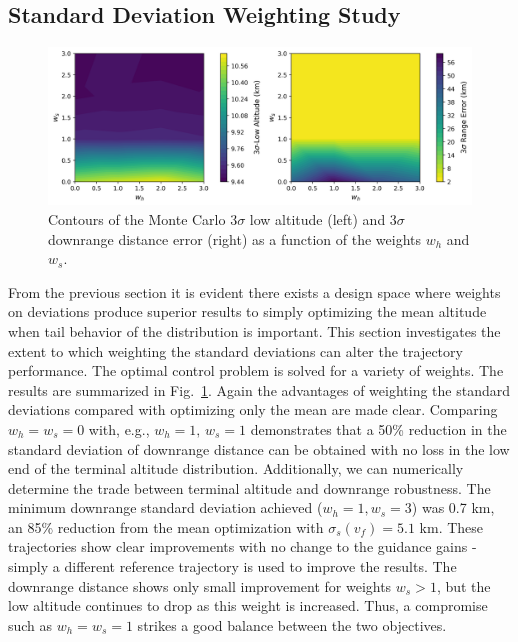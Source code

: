 \documentclass[journal ]{new-aiaa}
\begin{document}
\subsection*{Standard Deviation Weighting Study}
\begin{figure}[h!]
	\centering
	\includegraphics[width=1\textwidth]{ddp/python/WeightSweepMC}
	\caption{Contours of the Monte Carlo 3$\sigma$ low altitude (left) and 3$\sigma$ downrange distance error (right) as a function of the weights $w_h$ and $w_s$.}
	\label{fig_weight_sweep}
\end{figure}
From the previous section it is evident there exists a design space where weights on deviations produce superior results to simply optimizing the mean altitude when tail behavior of the distribution is important. This section investigates the extent to which weighting the standard deviations can alter the trajectory performance. The optimal control problem is solved for a variety of weights. The results are summarized in Fig.~\ref{fig_weight_sweep}. Again the advantages of weighting the standard deviations compared with optimizing only the mean are made clear. Comparing $w_h=w_s=0$ with, e.g., $w_h=1,\,w_s = 1$ demonstrates that a 50\% reduction in the standard deviation of downrange distance can be obtained with no loss in the low end of the terminal altitude distribution. Additionally, we can numerically determine the trade between terminal altitude and downrange robustness. The minimum downrange standard deviation achieved ($w_h=1,w_s=3$) was 0.7 km, an 85\% reduction from the mean optimization with $\sigma_s(v_f)=5.1$ km. These trajectories show clear improvements with no change to the guidance gains - simply a different reference trajectory is used to improve the results. The downrange distance shows only small improvement for weights $w_s>1$, but the low altitude continues to drop as this weight is increased. Thus, a compromise such as $w_h=w_s=1$ strikes a good balance between the two objectives. 
\end{document}
